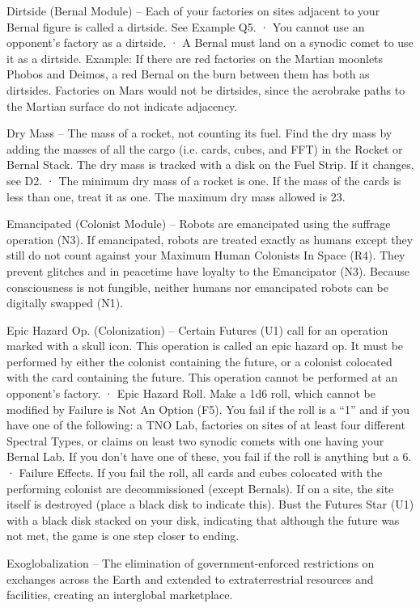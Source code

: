 \documentclass[a4paper]{book}
\begin{document}
Dirtside (Bernal Module) – Each of your factories on sites adjacent to your Bernal figure is called a dirtside. See Example Q5.
·       You cannot use an opponent’s factory as a dirtside.
·       A Bernal must land on a synodic comet to use it as a dirtside.
Example: If there are red factories on the Martian moonlets Phobos and Deimos, a red Bernal on the burn between them has both as dirtsides. Factories on Mars would not be dirtsides, since the aerobrake paths to the Martian surface do not indicate adjacency.

Dry Mass – The mass of a rocket, not counting its fuel. Find the dry mass by adding the masses of all the cargo (i.e. cards, cubes, and FFT) in the Rocket or Bernal Stack. The dry mass is tracked with a disk on the Fuel Strip. If it changes, see D2.
·   	The minimum dry mass of a rocket is one. If the mass of the cards is less than one, treat it as one. The maximum dry mass allowed is 23.

Emancipated (Colonist Module) – Robots are emancipated using the suffrage operation (N3). If emancipated, robots are treated exactly as humans except they still do not count against your Maximum Human Colonists In Space (R4). They prevent glitches and in peacetime have loyalty to the Emancipator (N3). Because consciousness is not fungible, neither humans nor emancipated robots can be digitally swapped (N1).

Epic Hazard Op. (Colonization) – Certain Futures (U1) call for an operation marked with a skull icon. This operation is called an epic hazard op. It must be performed by either the colonist containing the future, or a colonist colocated with the card containing the future. This operation cannot be performed at an opponent’s factory.
·       Epic Hazard Roll. Make a 1d6 roll, which cannot be modified by Failure is Not An Option (F5). You fail if the roll is a “1” and if you have one of the following: a TNO Lab, factories on sites of at least four different Spectral Types, or claims on least two synodic comets with one having your Bernal Lab. If you don’t have one of these, you fail if the roll is anything but a 6.
·       Failure Effects. If you fail the roll, all cards and cubes colocated with the performing colonist are decommissioned (except Bernals). If on a site, the site itself is destroyed (place a black disk to indicate this). Bust the Futures Star (U1) with a black disk stacked on your disk, indicating that although the future was not met, the game is one step closer to ending.

Exoglobalization – The elimination of government-enforced restrictions on exchanges across the Earth and extended to extraterrestrial resources and facilities, creating an interglobal marketplace.
\end{document}
